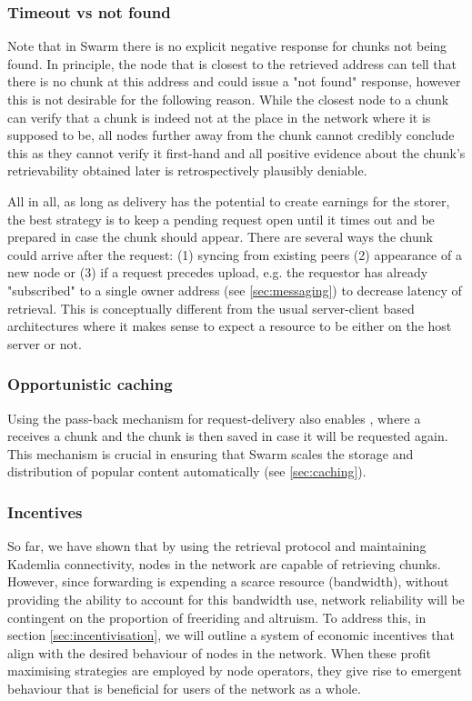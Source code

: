 \subsubsection{Timeout vs not found}

Note that in Swarm there is no explicit negative response for chunks not being found. In principle, the node that is closest to the retrieved address can tell that there is no chunk at this address and could issue a "not found" response, however this is not desirable for the following reason. While the closest node to a chunk can verify that a chunk is indeed not at the place in the network where it is supposed to be, all nodes further away from the chunk cannot credibly conclude this as they cannot verify it first-hand and all positive evidence about the chunk's retrievability obtained later is retrospectively plausibly deniable. 

All in all, as long as delivery has the potential to create earnings for the storer, the best strategy is to keep a pending request open until it times out and be prepared in case the chunk should appear. There are several ways the chunk could arrive after the request: (1) syncing from existing peers (2) appearance of a new node or (3) if a request precedes upload, e.g. the requestor has already "subscribed" to a single owner address (see \ref{sec:messaging}) to decrease latency of retrieval. This is conceptually different from the usual server-client based architectures where it makes sense to expect a resource to be either on the host server or not. 
 

\subsubsection{Opportunistic caching}

Using the pass-back mechanism for request-delivery also enables , where a  receives a chunk and the chunk is then saved in case it will be requested again. This mechanism is crucial in ensuring that Swarm scales the storage and distribution of popular content automatically (see \ref{sec:caching}).

\subsubsection{Incentives}

So far, we have shown that by using the retrieval protocol and maintaining Kademlia connectivity, nodes in the network are capable of retrieving chunks. However, since forwarding is expending a scarce resource (bandwidth), without providing the ability to account for this bandwidth use, network reliability will be contingent on the proportion of freeriding and altruism. To address this, in section \ref{sec:incentivisation}, we will outline a system of economic incentives that align with the desired behaviour of nodes in the network. When these profit maximising strategies are employed by node operators, they give rise to emergent behaviour that is beneficial for users of the network as a whole.
 
